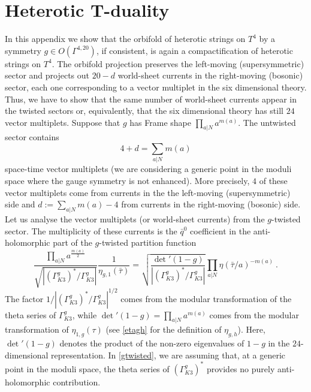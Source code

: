 \documentclass[a4paper,11pt]{article}
\numberwithin{equation}{section}
\def\be{\begin{equation}}
\def\ee{\end{equation}}
\begin{document}


\section{Heterotic T-duality}\label{a:hetTdual}

In this appendix we show that the orbifold of heterotic strings on $T^4$ by a symmetry $g\in O(\Gamma^{4,20})$, if consistent, is again a compactification of heterotic strings on $T^4$. The orbifold projection preserves the left-moving (supersymmetric) sector and projects out $20-d$ world-sheet currents in the right-moving (bosonic) sector, each one corresponding to a vector multiplet in the six dimensional theory. Thus, we have to show that the same number of world-sheet currents appear in the twisted sectors or, equivalently, that the six dimensional theory has still $24$ vector multiplets.
 Suppose that $g$ has Frame shape $\prod_{a|N} a^{m(a)}$. The untwisted sector contains 
\be\label{vmuntw} 4+d=\sum_{a|N} m(a) 
\ee space-time vector multiplets (we are considering a generic point in the moduli space where the gauge symmetry is not enhanced). More precisely, $4$ of these vector multiplets come from currents in the the left-moving (supersymmetric) side and $d:= \sum_{a|N} m(a)-4$ from currents in the right-moving (bosonic) side. Let us analyse the vector multiplets (or world-sheet currents) from the $g$-twisted sector. The multiplicity of these currents is the $\bar q^0$ coefficient in the anti-holomorphic part of the $g$-twisted  partition function
\be\label{gtwisted} \frac{\prod_{a|N} a^{\frac{m(a)}{2}}}{\sqrt{|(\Gamma_{K3}^g)^*/\Gamma_{K3}^g|}}\frac{1}{\eta_{g,1}(\bar\tau)}=\sqrt{\frac{\det'(1-g)}{|(\Gamma_{K3}^g)^*/\Gamma_{K3}^g|}}\prod_{a|N}\eta(\bar \tau/a)^{-m(a)}\ .
\ee The factor $1/|(\Gamma_{K3}^g)^*/\Gamma_{K3}^g|^{1/2}$ comes from the modular transformation of the theta series of $\Gamma_{K3}^g$, while $\det'(1-g)=\prod_{a|N} a^{m(a)}$ comes from the modular transformation of $\eta_{1,g}(\tau)$ (see \eqref{etagh} for the definition of $\eta_{g,h}$).  Here, $\det'(1-g)$ denotes the product of the non-zero eigenvalues of $1-g$ in the $24$-dimensional representation. In \eqref{gtwisted}, we are assuming that, at a generic point in the moduli space, the theta series of $(\Gamma_{K3}^g)^*$ provides no purely anti-holomorphic contribution.
\end{document}
